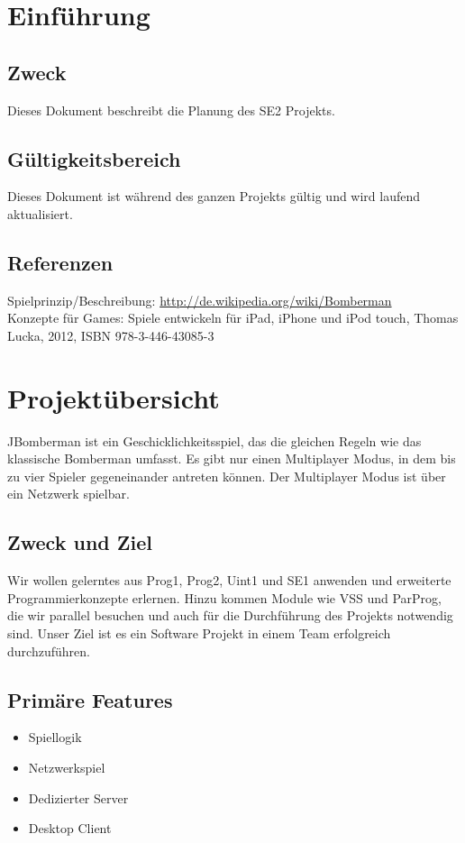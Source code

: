 \documentclass[11pt]{scrartcl}
\begin{document}
\newpage
\tableofcontents
\newpage

\section{Einführung}
\label{sec:Einführung}
\subsection{Zweck}
\label{sec:Zweck}
Dieses Dokument beschreibt die Planung des SE2 Projekts.
\subsection{Gültigkeitsbereich}
\label{sec:Gültigkeitsbereich}
Dieses Dokument ist während des ganzen Projekts gültig und wird laufend aktualisiert.
\subsection{Referenzen}
\label{sec:Refernzen}
Spielprinzip/Beschreibung: \href{http://de.wikipedia.org/wiki/Bomberman}{http://de.wikipedia.org/wiki/Bomberman} \\
Konzepte für Games: Spiele entwickeln für iPad, iPhone und iPod touch, Thomas Lucka, 2012, ISBN 978-3-446-43085-3

\section{Projektübersicht}
\label{sec:projektübersicht}
JBomberman ist ein Geschicklichkeitsspiel, das die gleichen Regeln wie das klassische Bomberman umfasst. Es gibt nur einen Multiplayer Modus, in dem bis zu vier Spieler gegeneinander antreten können. Der Multiplayer Modus ist über ein Netzwerk spielbar.

\subsection{Zweck und Ziel}
\label{sec:Zweck und Ziel}
Wir wollen gelerntes aus Prog1, Prog2, Uint1 und SE1 anwenden und erweiterte Programmierkonzepte erlernen. Hinzu kommen Module wie VSS und ParProg, die wir parallel besuchen und auch für die Durchführung des Projekts notwendig sind.
Unser Ziel ist es ein Software Projekt in einem Team erfolgreich durchzuführen.
 

\subsection{Primäre Features}
\label{sec:Primäre Features}
\begin{itemize}
    \item Spiellogik
    \item Netzwerkspiel
    \item Dedizierter Server
    \item Desktop Client
\end{itemize}
\end{document}
